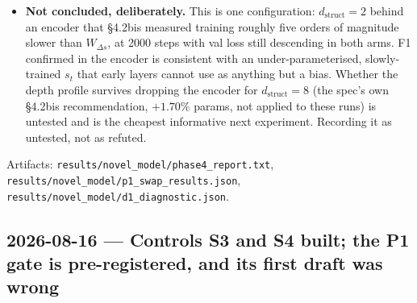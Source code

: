 \documentclass[11pt,a4paper]{article}
\newcommand{\code}[1]{\texttt{\small #1}}
\begin{document}
\begin{itemize}
\item \textbf{Not concluded, deliberately.} This is one configuration:
$d_{\text{struct}}=2$ behind an encoder that \S4.2bis measured training roughly
five orders of magnitude slower than $W_{\Delta s}$, at 2000 steps with val loss
still descending in both arms. F1 confirmed in the encoder is consistent with an
under-parameterised, slowly-trained $s_t$ that early layers cannot use as
anything but a bias. Whether the depth profile survives dropping the encoder for
$d_{\text{struct}}=8$ (the spec's own \S4.2bis recommendation, $+1.70\%$ params,
not applied to these runs) is untested and is the cheapest informative next
experiment. Recording it as untested, not as refuted.

\end{itemize}

Artifacts: \code{results/novel\_model/phase4\_report.txt},
\code{results/novel\_model/p1\_swap\_results.json},
\code{results/novel\_model/d1\_diagnostic.json}.

\subsection*{2026-08-16 --- Controls S3 and S4 built; the P1 gate is
pre-registered, and its first draft was wrong}
\end{document}
